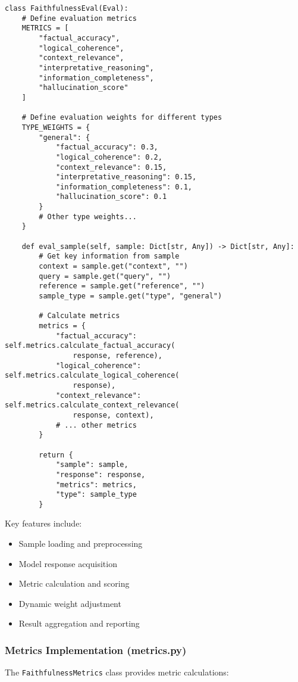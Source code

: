 \begin{lstlisting}[basicstyle=\ttfamily\small,breaklines=true,columns=flexible]
class FaithfulnessEval(Eval):
    # Define evaluation metrics
    METRICS = [
        "factual_accuracy",
        "logical_coherence",
        "context_relevance",
        "interpretative_reasoning",
        "information_completeness",
        "hallucination_score"
    ]
    
    # Define evaluation weights for different types
    TYPE_WEIGHTS = {
        "general": {
            "factual_accuracy": 0.3,
            "logical_coherence": 0.2,
            "context_relevance": 0.15,
            "interpretative_reasoning": 0.15,
            "information_completeness": 0.1,
            "hallucination_score": 0.1
        }
        # Other type weights...
    }
    
    def eval_sample(self, sample: Dict[str, Any]) -> Dict[str, Any]:
        # Get key information from sample
        context = sample.get("context", "")
        query = sample.get("query", "")
        reference = sample.get("reference", "")
        sample_type = sample.get("type", "general")
        
        # Calculate metrics
        metrics = {
            "factual_accuracy": self.metrics.calculate_factual_accuracy(
                response, reference),
            "logical_coherence": self.metrics.calculate_logical_coherence(
                response),
            "context_relevance": self.metrics.calculate_context_relevance(
                response, context),
            # ... other metrics
        }
        
        return {
            "sample": sample,
            "response": response,
            "metrics": metrics,
            "type": sample_type
        }
\end{lstlisting}

Key features include:
\begin{itemize}
    \item Sample loading and preprocessing
    \item Model response acquisition
    \item Metric calculation and scoring
    \item Dynamic weight adjustment
    \item Result aggregation and reporting
\end{itemize}

\subsubsection{Metrics Implementation (metrics.py)}
The \texttt{FaithfulnessMetrics} class provides metric calculations:

